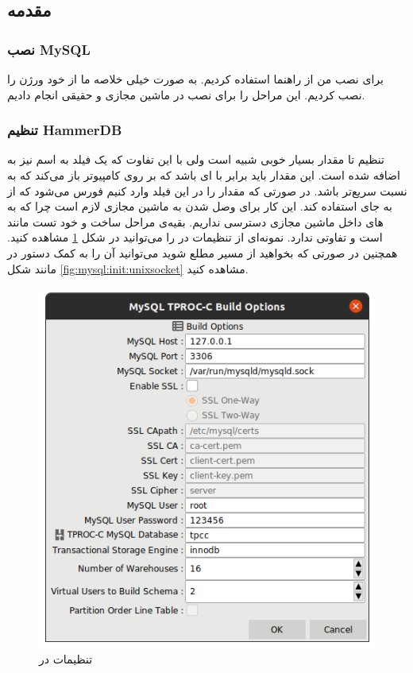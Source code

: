 \subsection{مقدمه}
\subsubsection{نصب MySQL}
برای نصب
من از
راهنما استفاده کردیم. به صورت خیلی خلاصه ما از خود
 ورژن 
را نصب کردیم. این مراحل را برای نصب در ماشین مجازی و حقیقی انجام دادیم.
\subsubsection{تنظیم HammerDB}
تنظیم
تا مقدار بسیار خوبی شبیه
است ولی با این تفاوت که یک فیلد به اسم
نیز به
اضافه شده است. این مقدار باید برابر با
ای
باشد که
بر روی کامپیوتر باز می‌کند که به نسبت
سریع‌تر باشد. در صورتی که مقدار
را در این فیلد وارد کنیم
فورس می‌شود که از
به جای
استفاده کند. این کار برای وصل شدن به ماشین مجازی لازم است چرا که به
های
داخل ماشین مجازی دسترسی نداریم. بقیه‌ی مراحل ساخت
و خود تست مانند
است و تفاوتی ندارد. نمونه‌ای از تنظیمات
 در 
را می‌توانید در شکل
\ref{fig:mysql:init:hammerdb_driver}
مشاهده کنید. همچنین در صورتی که بخواهید از مسیر
مطلع شوید می‌توانید آن را به کمک دستور
در
مانند شکل
\ref{fig:mysql:init:unixsocket}
مشاهده کنید.
\begin{figure}[H]
    \centering
    \includegraphics[scale=0.5]{pictures/mysql/baremetal/hammerdb-driver.png}
    \caption{تنظیمات  در }
    \label{fig:mysql:init:hammerdb_driver}
\end{figure}
